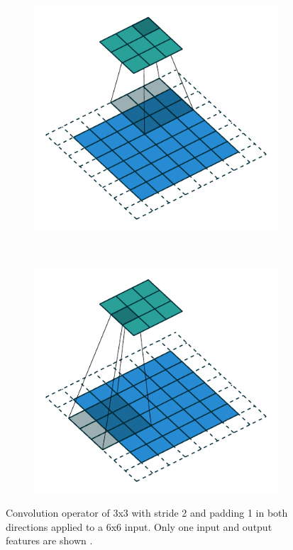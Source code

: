 \begin{figure}[!ht]
	\begin{subfigure}{0.2\textwidth}
	\includegraphics[scale=0.5]{Figures/chapter_background/convolution_operator/padding_strides_odd_02.pdf}
	\end{subfigure}
	~ %
	\begin{subfigure}{0.2\textwidth}
	\includegraphics[scale=0.5]{Figures/chapter_background/convolution_operator/padding_strides_odd_03.pdf}
	\end{subfigure}
	\caption[Convolution operator of 3x3, stride 2, padding 1]{Convolution operator of 3x3 with stride 2 and padding 1 in both directions applied to a 6x6 input. Only one input and output features are shown \citep{dumoulin2016guide}.}
	\label{back:fig:convolution_operator}
\end{figure}

